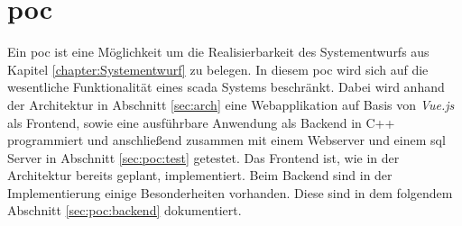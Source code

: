 \chapter{\acl{poc}}
Ein \ac{poc} ist eine Möglichkeit um die Realisierbarkeit des Systementwurfs aus Kapitel \ref{chapter:Systementwurf} zu belegen.
In diesem  \ac{poc} wird sich auf die wesentliche Funktionalität eines \ac{scada} Systems beschränkt.
Dabei wird anhand der Architektur in Abschnitt \ref{sec:arch} eine Webapplikation auf Basis von \emph{Vue.js} als Frontend, 
sowie eine ausführbare Anwendung als Backend in C++ programmiert und anschließend zusammen mit einem Webserver und einem \ac{sql} Server in Abschnitt \ref{sec:poc:test} getestet.
Das Frontend ist, wie in der Architektur bereits geplant, implementiert. Beim Backend sind in der Implementierung einige Besonderheiten vorhanden.
Diese sind in dem folgendem Abschnitt \ref{sec:poc:backend} dokumentiert.


%
